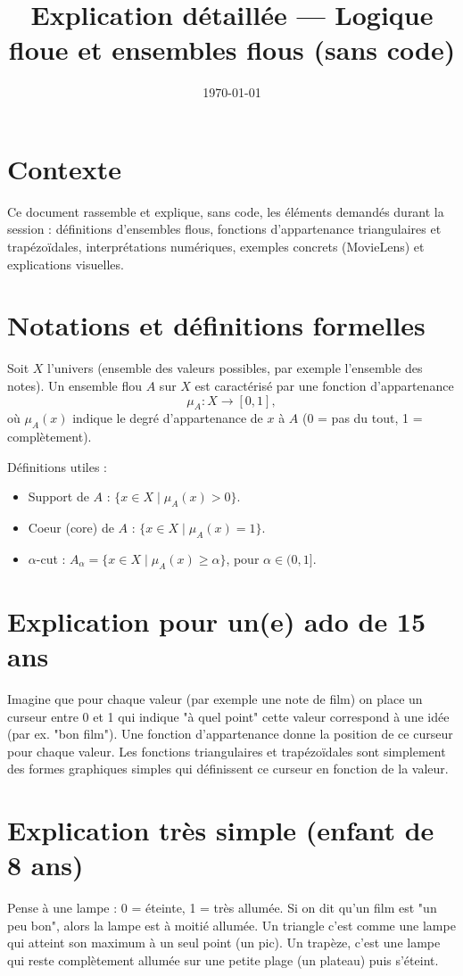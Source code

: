 \documentclass[a4paper,11pt]{article}
\title{Explication détaillée — Logique floue et ensembles flous (sans code)}
\author{}
\date{\today}
\begin{document}
\maketitle

\section*{Contexte}
Ce document rassemble et explique, sans code, les éléments demandés durant la session : définitions d'ensembles flous, fonctions d'appartenance triangulaires et trapézoïdales, interprétations numériques, exemples concrets (MovieLens) et explications visuelles.

\section{Notations et définitions formelles}
Soit $X$ l'univers (ensemble des valeurs possibles, par exemple l'ensemble des notes). Un ensemble flou $A$ sur $X$ est caractérisé par une fonction d'appartenance
$$\mu_A : X \to [0,1],$$
où $\mu_A(x)$ indique le degré d'appartenance de $x$ à $A$ (0 = pas du tout, 1 = complètement).

Définitions utiles :
\begin{itemize}
  \item Support de $A$ : $\{x\in X\mid \mu_A(x)>0\}$.
  \item Coeur (core) de $A$ : $\{x\in X\mid \mu_A(x)=1\}$.
  \item $\alpha$-cut : $A_\alpha=\{x\in X\mid \mu_A(x)\ge \alpha\}$, pour $\alpha\in(0,1]$.
\end{itemize}

\section{Explication pour un(e) ado de 15 ans}
Imagine que pour chaque valeur (par exemple une note de film) on place un curseur entre 0 et 1 qui indique "à quel point" cette valeur correspond à une idée (par ex. "bon film"). Une fonction d'appartenance donne la position de ce curseur pour chaque valeur. Les fonctions triangulaires et trapézoïdales sont simplement des formes graphiques simples qui définissent ce curseur en fonction de la valeur.

\section{Explication très simple (enfant de 8 ans)}
Pense à une lampe : 0 = éteinte, 1 = très allumée. Si on dit qu'un film est "un peu bon", alors la lampe est à moitié allumée. Un triangle c'est comme une lampe qui atteint son maximum à un seul point (un pic). Un trapèze, c'est une lampe qui reste complètement allumée sur une petite plage (un plateau) puis s'éteint.
\end{document}
